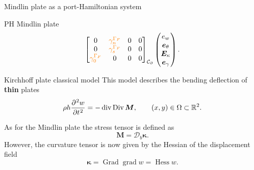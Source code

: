 \documentclass[aspectratio=169]{ISAE-Beamer}
\DeclareMathOperator*{\grad}{grad}
\DeclareMathOperator*{\Grad}{Grad}
\DeclareMathOperator*{\Div}{Div}
\renewcommand{\div}{\operatorname{div}}
\DeclareMathOperator*{\Hess}{Hess}
\newcommand{\bbR}{\mathbb{R}}
\begin{document}
\begin{frame}{Mindlin plate as a port-Hamiltonian system}
\begin{block}{PH Mindlin plate}
\begin{equation*}
\begin{aligned}
{\begin{bmatrix}
			{0} & \textcolor{orange}{\gamma_{n}^{\Gamma_F}} & {0} & {0} \\
			{0} & \textcolor{orange}{\gamma_{s}^{\Gamma_F}} & {0} & {0} \\
			\textcolor{orange}{\gamma_{0}^{\Gamma_F}} & {0} & {0} & {0} \\
			\end{bmatrix}}_{\mathcal{C}_\partial}
		\begin{pmatrix}
		e_w \\
		\bm{e}_{\theta} \\
		\bm{E}_{\kappa} \\
		\bm{e}_{\gamma} \\
		\end{pmatrix}.
		\end{aligned}
		\end{equation*}
	\end{block}
\end{frame}

\begin{frame}{Kirchhoff plate classical model}
	This model describes the bending deflection of \textbf{thin} plates
	\begin{equation*}
	\rho h \diffp[2]{w}{t} = - \div\Div \bm{M}, \qquad (x,y) \in \Omega \subset \bbR^2.
	\end{equation*}

	As for the Mindlin plate the stress tensor is defined as 
	$$\bm{M} = \bm{\mathcal{D}}_b \bm{\kappa}.$$
	However, the curvature tensor is now given by the Hessian of the displacement field
	$$\bm{\kappa} = \Grad\grad w = \Hess w.$$
\end{frame}
\end{document}

